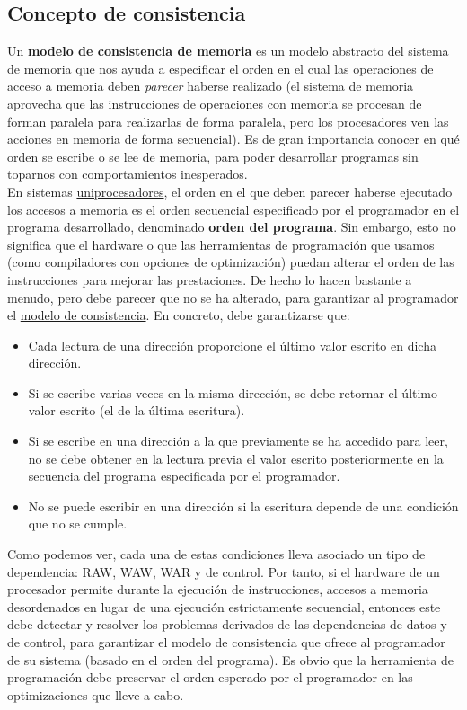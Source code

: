 \subsection{Concepto de consistencia}
Un \textbf{modelo de consistencia de memoria} es un modelo abstracto del sistema de memoria que nos ayuda a especificar el orden en el cual las operaciones de acceso a memoria deben \emph{parecer} haberse realizado (el sistema de memoria aprovecha que las instrucciones de operaciones con memoria se procesan de forman paralela para realizarlas de forma paralela, pero los procesadores ven las acciones en memoria de forma secuencial). Es de gran importancia conocer en qué orden se escribe o se lee de memoria, para poder desarrollar programas sin toparnos con comportamientos inesperados.\\

En sistemas \underline{uniprocesadores}, el orden en el que deben parecer haberse ejecutado los accesos a memoria es el orden secuencial especificado por el programador en el programa desarrollado, denominado \textbf{orden del programa}. Sin embargo, esto no significa que el hardware o que las herramientas de programación que usamos (como compiladores con opciones de optimización) puedan alterar el orden de las instrucciones para mejorar las prestaciones. De hecho lo hacen bastante a menudo, pero debe parecer que no se ha alterado, para garantizar al programador el \underline{modelo de consistencia}. En concreto, debe garantizarse que:
\begin{itemize}
    \item Cada lectura de una dirección proporcione el último valor escrito en dicha dirección.
    \item Si se escribe varias veces en la misma dirección, se debe retornar el último valor escrito (el de la última escritura). 
    \item Si se escribe en una dirección a la que previamente se ha accedido para leer, no se debe obtener en la lectura previa el valor escrito posteriormente en la secuencia del programa especificada por el programador. 
    \item No se puede escribir en una dirección si la escritura depende de una condición que no se cumple.
\end{itemize}
Como podemos ver, cada una de estas condiciones lleva asociado un tipo de dependencia: RAW, WAW, WAR y de control. Por tanto, si el hardware de un procesador permite durante la ejecución de instrucciones, accesos a memoria desordenados en lugar de una ejecución estrictamente secuencial, entonces este debe detectar y resolver los problemas derivados de las dependencias de datos y de control, para garantizar el modelo de consistencia que ofrece al programador de su sistema (basado en el orden del programa). Es obvio que la herramienta de programación debe preservar el orden esperado por el programador en las optimizaciones que lleve a cabo.\\

